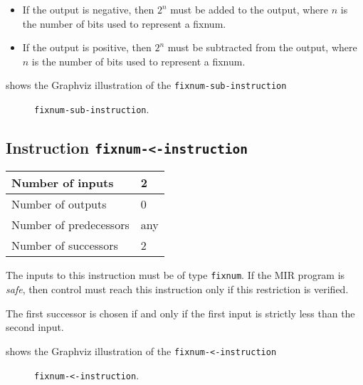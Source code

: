 \begin{itemize}
\item If the output is negative, then $2^n$ must be added to the
  output, where $n$ is the number of bits used to represent a fixnum. 
\item If the output is positive, then $2^n$ must be subtracted from
  the output, where $n$ is the number of bits used to represent a
  fixnum.
\end{itemize}

 shows the Graphviz illustration of the
\texttt{fixnum-sub-instruction}

\begin{figure}
\begin{center}
\end{center}
\caption{\label{fig-fixnum-sub-instruction}
\texttt{fixnum-sub-instruction}.}
\end{figure}

\subsection{Instruction \texttt{fixnum-<-instruction}}
\label{mir-instruction-fixnum-less}

\begin{tabular}{|l|l|}
\hline
Number of inputs & 2\\
\hline
Number of outputs & 0\\
\hline
Number of predecessors & any\\
\hline
Number of successors & 2\\
\hline
\end{tabular}

The inputs to this instruction must be of type \texttt{fixnum}.  If the
MIR program is \emph{safe}, then control must reach this instruction
only if this restriction is verified.

The first successor is chosen if and only if the first input is
strictly less than the second input.

 shows the Graphviz illustration of the
\texttt{fixnum-<-instruction}

\begin{figure}
\begin{center}
\end{center}
\caption{\label{fig-fixnum-less-instruction}
\texttt{fixnum-<-instruction}.}
\end{figure}


